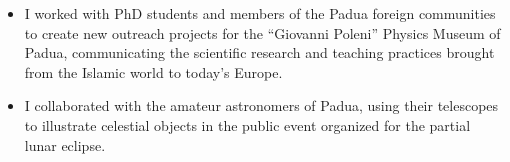 \begin{experiences}
    \emptySeparator
     {}{
     \begin{itemize}
         \item I worked with PhD students and members of the Padua foreign communities to create new outreach projects for the ``Giovanni Poleni'' Physics Museum of Padua, communicating the scientific research and teaching practices brought from the Islamic world to today's Europe.
     \end{itemize}}
    \emptySeparator
     {}{
     \begin{itemize}
         \item I collaborated with the amateur astronomers of Padua, using their telescopes to illustrate celestial objects in the public event organized for the partial lunar eclipse.
     \end{itemize}}
\end{experiences}